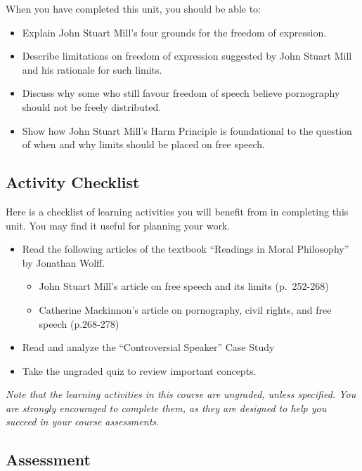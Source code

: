 \documentclass[
]{book}
\providecommand{\tightlist}{%
  \setlength{\itemsep}{0pt}\setlength{\parskip}{0pt}}
\begin{document}
When you have completed this unit, you should be able to:

\begin{itemize}
\tightlist
\item
  Explain John Stuart Mill's four grounds for the freedom of expression.
\item
  Describe limitations on freedom of expression suggested by John Stuart Mill and his rationale for such limits.
\item
  Discuss why some who still favour freedom of speech believe pornography should not be freely distributed.
\item
  Show how John Stuart Mill's Harm Principle is foundational to the question of when and why limits should be placed on free speech.
\end{itemize}

\hypertarget{activity-checklist-2}{%
\subsection*{Activity Checklist}\label{activity-checklist-2}}

Here is a checklist of learning activities you will benefit from in completing this unit. You may find it useful for planning your work.

\begin{itemize}
\tightlist
\item
  Read the following articles of the textbook ``Readings in Moral Philosophy'' by Jonathan Wolff.

  \begin{itemize}
  \tightlist
  \item
    John Stuart Mill's article on free speech and its limits (p.~252-268)
  \item
    Catherine Mackinnon's article on pornography, civil rights, and free speech (p.268-278)
  \end{itemize}
\item
  Read and analyze the ``Controversial Speaker'' Case Study
\item
  Take the ungraded quiz to review important concepts.
\end{itemize}

\emph{Note that the learning activities in this course are ungraded, unless specified. You are strongly encouraged to complete them, as they are designed to help you succeed in your course assessments.}

\hypertarget{assessment-4}{%
\subsection*{Assessment}\label{assessment-4}}
\end{document}

